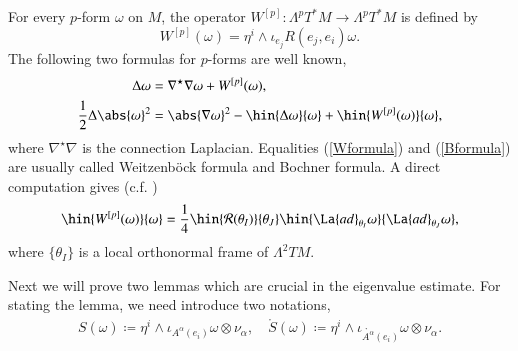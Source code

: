 \documentclass[12pt]{amsart}
\theoremstyle{plain}
\theoremstyle{remark}
\theoremstyle{definition}
\numberwithin{equation}{section}
\begin{document}
For every $p$-form $\omega$ on $M$, the operator $W^{[p]}:\Lambda^pT^*M\to \Lambda^pT^*M$ is defined by
$$
W^{[p]}(\omega)=\eta^i\wedge\iota_{e_j}R(e_j,e_i)\omega.
$$
The following two  formulas for $p$-forms are well known,
\begin{align}\label{Wformula}
\Delta\omega&=\nabla^\star\nabla\omega+W^{[p]}(\omega),\\
\label{Bformula}\dfrac12\Delta\abs{\omega}^2&=\abs{\nabla\omega}^2
-\hin{\Delta\omega}{\omega}
+\hin{W^{[p]}(\omega)}{\omega},
\end{align}
where   $\nabla^\star\nabla$ is the connection Laplacian.
Equalities (\ref{Wformula}) and (\ref{Bformula}) are usually called Weitzenb\"{o}ck formula and Bochner formula.
A direct computation gives (c.f. \cite{LawMic89})
\begin{align*}
\hin{W^{[p]}(\omega)}{\omega}=\dfrac14\hin{\mathcal{R}(\theta_I)}{\theta_J}\hin{\La{ad}_{\theta_I}\omega}{\La{ad}_{\theta_J}\omega},
\end{align*}
where $\{\theta_I\}$ is a local orthonormal frame of $\Lambda^2TM$.

Next we will prove two lemmas which are crucial in the eigenvalue estimate.
For stating the lemma, we need introduce two notations,
\begin{align*}
S(\omega)\coloneqq\eta^i\wedge\iota_{A^{\alpha}(e_i)}\omega\otimes\nu_{\alpha},
\quad
\mathring{S}(\omega)\coloneqq\eta^i\wedge\iota_{\mathring{A^{\alpha}}(e_i)}\omega\otimes\nu_{\alpha}.
\end{align*}
\end{document}
